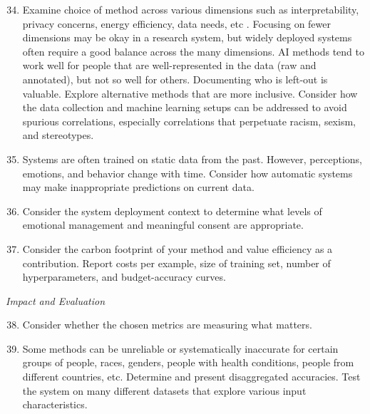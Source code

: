 \documentclass{clv3}
\begin{document}
{\begin{enumerate}
  \setcounter{enumi}{33}
\item Examine choice of method across various dimensions such as interpretability, privacy concerns, energy efficiency, data needs, etc . Focusing on fewer dimensions may be okay in a research system, but widely deployed systems often require a good balance across the many dimensions.
AI methods tend to work well for people that are well-represented in the data (raw and annotated), but not so well for others. Documenting who is left-out is valuable. Explore alternative methods that are more inclusive. %
Consider how the data collection and machine learning setups can be addressed to avoid spurious correlations, especially correlations that perpetuate racism, sexism, and stereotypes.
\item Systems are often trained on static data from the past. However, perceptions, emotions, and behavior change with time. Consider how automatic systems may make inappropriate predictions on current data.
\item Consider the system deployment context to determine what levels of emotional management and meaningful consent are appropriate.
\item Consider the carbon footprint of your method and value efficiency as a contribution. Report costs per example, size of training set, number of hyperparameters, and budget-accuracy curves.
\end{enumerate}
\noindent \textit{Impact and Evaluation}
\begin{enumerate}
  \setcounter{enumi}{37}
\item Consider whether the chosen metrics are measuring what matters.
\item Some methods can be unreliable or systematically inaccurate for certain groups of people, races, genders, people with health conditions, people from different countries, etc. Determine and present disaggregated accuracies.
Test the system on many different datasets that explore various input characteristics. 

\end{enumerate}}
\end{document}
